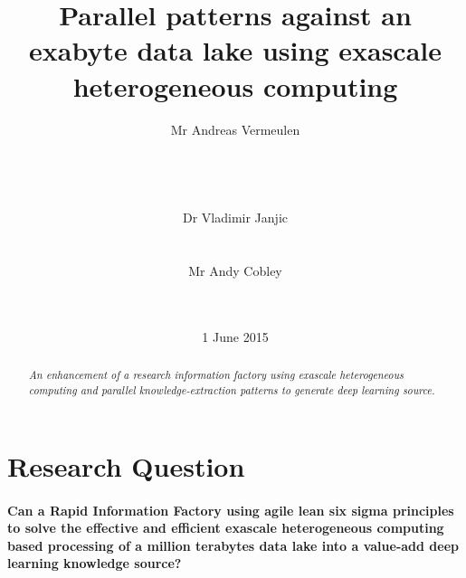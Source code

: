 \documentclass{acm_proc_article-sp}
\begin{document}
\title{Parallel patterns against an exabyte data lake using exascale heterogeneous computing}
\subtitle{}
\author{
\alignauthor
Mr Andreas Vermeulen\\
\\
\\
\\
\\
\alignauthor
Dr Vladimir Janjic\\
\\
\\
\alignauthor
Mr Andy Cobley\\
\\
\\
}
\date{1 June 2015}
\maketitle
\begin{abstract}
\textit{An enhancement of a research information factory using exascale heterogeneous computing and parallel knowledge-extraction patterns to generate deep learning source.}
\end{abstract}
\begin{tiny}
\end{tiny}
\section{Research Question}
\paragraph{Can a Rapid Information Factory using agile lean six sigma principles to solve the effective and efficient exascale heterogeneous computing based processing of a million terabytes data lake into a value-add deep learning knowledge source?}
\end{document}
